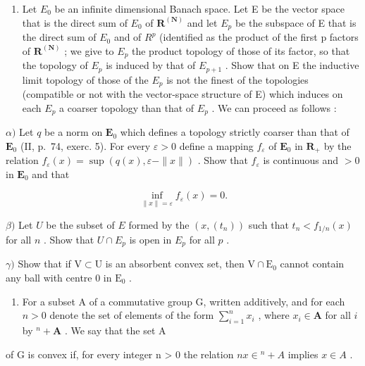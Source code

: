 \begin{enumerate}
\def\labelenumi{\alph{enumi})}
\setcounter{enumi}{1}
\tightlist
\item
  Let \(E_{0}\) be an infinite dimensional Banach space. Let E be the vector space that is the direct sum of \(E_{0}\) of \(\mathbf{R}^{(\mathbf{N})}\) and let \(E_{p}\) be the subspace of E that is the direct sum of \(E_{0}\) and of \(R^{p}\) (identified as the product of the first p factors of \(\mathbf{R}^{(\mathbf{N})}\) ; we give to \(E_{p}\) the product topology of those of its factor, so that the topology of \(E_{p}\) is induced by that of \(E_{p+1}\) . Show that on E the inductive limit topology of those of the \(E_{p}\) is not the finest of the topologies (compatible or not with the vector-space structure of E) which induces on each \(E_{p}\) a coarser topology than that of \(E_{p}\) . We can proceed as follows :
\end{enumerate}

\(\alpha)\) Let \(q\) be a norm on \(\mathbf{E}_0\) which defines a topology strictly coarser than that of \(\mathbf{E}_0\) (II, p.~74, exerc. 5). For every \(\varepsilon > 0\) define a mapping \(f_{\varepsilon}\) of \(\mathbf{E}_0\) in \(\mathbf{R}_+\) by the relation \(f_{\varepsilon}(x) = \sup(q(x), \varepsilon - \| x \|)\) . Show that \(f_{\varepsilon}\) is continuous and \(>0\) in \(\mathbf{E}_0\) and that

\[
\inf_{\| x \| = \varepsilon} f_{\varepsilon}(x) = 0 .
\]

\(\beta)\) Let \(U\) be the subset of \(E\) formed by the \((x, (t_n))\) such that \(t_n < f_{1/n}(x)\) for all \(n\) . Show that \(U \cap E_p\) is open in \(E_p\) for all \(p\) .

\(\gamma)\) Show that if \(\mathrm{V} \subset \mathrm{U}\) is an absorbent convex set, then \(\mathrm{V} \cap \mathrm{E}_0\) cannot contain any ball with centre 0 in \(\mathrm{E}_0\) .

\begin{enumerate}
\def\labelenumi{\arabic{enumi})}
\setcounter{enumi}{16}
\tightlist
\item
  For a subset A of a commutative group G, written additively, and for each \(n > 0\) denote the set of elements of the form \(\sum_{i=1}^{n} x_i\) , where \(x_i \in \mathbf{A}\) for all \(i\) by \({}^{n}+\mathbf{A}\) . We say that the set A
\end{enumerate}

of G is convex if, for every integer n > 0 the relation \(nx \in {}^{n}+A\) implies \(x \in A\) .

